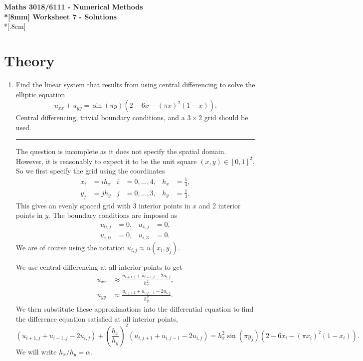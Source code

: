 \documentclass[10pt]{article}
\begin{document}
\thispagestyle{empty}
\begin{center}
\textbf{\Large Maths 3018/6111 - Numerical Methods \\*[8mm]
Worksheet 7 - Solutions}\\*[.8cm]
\end{center}

\section*{Theory}

\begin{enumerate}
\item Find the linear system that results from using central
  differencing to solve the elliptic equation
  \begin{equation*}
    u_{xx} + u_{yy} = \sin ( \pi y ) \left( 2 - 6 x - (\pi x)^2 (1 -
      x) \right).
  \end{equation*}
  Central differencing, trivial boundary conditions, and a $3 \times
  2$ grid should be used.
  \begin{center}
    \rule{0.9\textwidth}{.1pt}
  \end{center}
  The question is incomplete as it does not specify the spatial
  domain. However, it is reasonably to expect it to be the unit square
  $(x, y) \in [0, 1]^2$. So we first specify the grid using the
  coordinates
  \begin{align*}
    x_i & = i h_x & i & = 0, \dots, 4, & h_x & = \frac{1}{4}, \\
    y_j & = j h_y & j & = 0, \dots, 3, & h_y & = \frac{1}{3}.
  \end{align*}
  This gives an evenly spaced grid with 3 interior points in $x$ and 2
  interior points in $y$. The boundary conditions are imposed as
  \begin{align*}
    u_{0, j} & = 0, & u_{4, j} & = 0, \\
    u_{i, 0} & = 0, & u_{i, 3} & = 0.
  \end{align*}
  We are of course using the notation $u_{i,j} \approx u(x_i, y_j)$.

  We use central differencing at all interior points to get
  \begin{align*}
    u_{xx} & \approx \frac{u_{i+1,j} + u_{i-1,j} - 2 u_{i,j}}{h_x^2}, \\
    u_{yy} & \approx \frac{u_{i,j+1} + u_{i,j-1} - 2 u_{i,j}}{h_y^2}.
  \end{align*}
  We then substitute these approximations into the differential
  equation to find the difference equation satisfied at all interior
  points,
  \begin{equation*}
    \left(u_{i+1,j} + u_{i-1,j} - 2 u_{i,j} \right) + \left(
      \frac{h_x}{h_y} \right)^2 \left( u_{i,j+1} + u_{i,j-1} - 2
      u_{i,j} \right) = h_x^2 \sin ( \pi y_j ) \left( 2 - 6 x_i - (\pi
      x_i)^2 (1 - x_i) \right).
  \end{equation*}
  We will write $h_x / h_y = \alpha$.


\end{enumerate}
\end{document}
